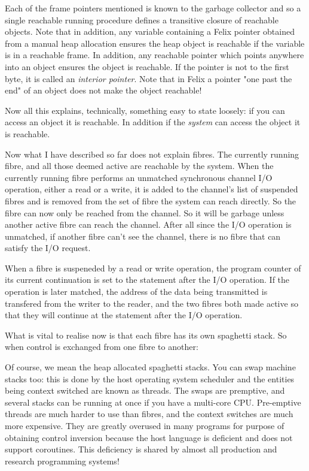 \documentclass[oneside]{book}
\begin{document}
Each of the frame pointers mentioned is known to the garbage collector
and so a single reachable running procedure defines a transitive
closure of reachable objects. Note that in addition, any variable
containing a Felix pointer obtained from a manual heap allocation
ensures the heap object is reachable if the variable is in a 
reachable frame. In addition, any reachable pointer which points
anywhere into an object ensures the object is reachable.
If the pointer is not to the first byte, it is called
an {\em interior pointer}. Note that in Felix a pointer
"one past the end" of an object does not make the object
reachable!

Now all this explains, technically, something easy to state
loosely: if you can access an object it is reachable.
In addition if the {\em system} can access the object it
is reachable.

Now what I have described so far does not explain fibres.
The currently running fibre, and all those deemed active
are reachable by the system. When the currently running fibre
performs an unmatched synchronous channel I/O operation,
either a read or a write, it is added to the channel's
list of suspended fibres and is removed from the set of
fibre the system can reach directly. So the fibre can now
only be reached from the channel. So it will be garbage
unless another active fibre can reach the channel.
After all since the I/O operation is unmatched, if another
fibre can't see the channel, there is no fibre that
can satisfy the I/O request.

When a fibre is suspeneded by a read or write operation,
the program counter of its current continuation is set
to the statement after the I/O operation. If the operation
is later matched, the address of the data being transmitted
is transfered from the writer to the reader, and the two
fibres both made active so that they will continue
at the statement after the I/O operation.

What is vital to realise now is that each fibre has its
own spaghetti stack. So when control is exchanged
from one fibre to another:


Of course, we mean the heap allocated spaghetti stacks.
You can swap machine stacks too: this is done by the host
operating system scheduler and the entities being context
switched are known as threads. The swaps are premptive,
and several stacks can be running at once if you have a 
multi-core CPU. Pre-emptive threads are much harder to use
than fibres, and the context switches are much more
expensive. They are greatly overused in many programs
for purpose of obtaining control inversion because
the host language is deficient and does not support
coroutines. This deficiency is shared by almost all
production and research programming systems!
\end{document}
